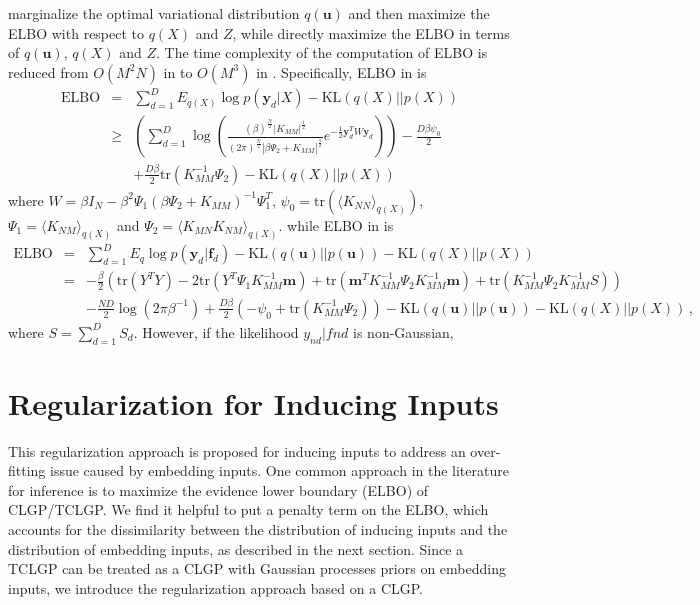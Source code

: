 \documentclass{article}
\begin{document}
\cite{Titsias_2010} marginalize the optimal variational distribution $q(\bm u)$ and then maximize the ELBO with respect to $q(X)$ and $Z$, while \cite{Hensman_2013} directly maximize the ELBO in terms of $q(\bm u)$, $q(X)$ and $Z$. The time complexity of the computation of ELBO is reduced from $O(M^2N)$ in \cite{Titsias_2010} to $O(M^3)$ in \cite{Hensman_2013}. Specifically, ELBO in \cite{Titsias_2010} is
\begin{eqnarray}
\mathrm{ELBO} & = & \sum_{d = 1}^{D} E_{q(X)}\log p(\bm y_d|X) - \mathrm{KL}(q(X)||p(X)) \nonumber \\
& \geq & \left(\sum_{d = 1}^D\log\left(\frac{(\beta)^{\frac{N}{2}}|K_{MM}|^{\frac{1}{2}}}{(2\pi)^{\frac{N}{2}}|\beta\Psi_2 + K_{MM}|^{\frac{1}{2}}} e^{-\frac{1}{2}\bm y_d^TW\bm y_d} \right)\right) - \frac{D\beta\psi_0}{2} \nonumber \\
& & + \frac{D\beta}{2}\mathrm{tr}(K^{-1}_{MM}\Psi_2)- \mathrm{KL}(q(X)||p(X)) \nonumber 
\end{eqnarray}
where $W = \beta I_N - \beta^2\Psi_1(\beta\Psi_2 + K_{MM})^{-1}\Psi_1^T$, $\psi_0 = \mathrm{tr}(\langle K_{NN} \rangle_{q(X)})$, $\Psi_1 = \langle K_{NM} \rangle_{q(X)}$ and $\Psi_2 = \langle K_{MN}K_{NM}\rangle_{q(X)}$. while ELBO in \cite{Hensman_2013} is
\begin{eqnarray}
\mathrm{ELBO} & = & \sum_{d = 1}^{D}E_{q}\log p(\bm y_d|\bm f_d) - \mathrm{KL}(q(\bm u)||p(\bm u)) - \mathrm{KL}(q(X)||p(X)) \nonumber \\
& = & - \frac{\beta}{2}\left( \mathrm{tr}(Y^TY) - 2\mathrm{tr}(Y^T\Psi_1K_{MM}^{-1}\bm m) + \mathrm{tr}(\bm m^TK_{MM}^{-1}\Psi_2K_{MM}^{-1}\bm m) + \mathrm{tr}(K_{MM}^{-1}\Psi_2K_{MM}^{-1}S) \right) \nonumber \\
& & -\frac{ND}{2}\log(2\pi\beta^{-1}) + \frac{D\beta}{2}\left(-\psi_0 + \mathrm{tr}(K_{MM}^{-1}\Psi_2)\right) - \mathrm{KL}(q(\bm u)||p(\bm u)) - \mathrm{KL}(q(X)||p(X)) \,, \nonumber
\end{eqnarray}
where $S = \sum_{d=1}^{D}S_d$. However, if the likelihood $y_{nd}|f{nd}$ is non-Gaussian, 
	
\section{Regularization for Inducing Inputs}
This regularization approach is proposed for inducing inputs to address an over-fitting issue caused by embedding inputs. One common approach in the literature for inference is to maximize the evidence lower boundary (ELBO) of CLGP/TCLGP. We find it helpful to put a penalty term on the ELBO, which accounts for the dissimilarity between the distribution of inducing inputs and the distribution of embedding inputs, as described in the next section. Since a TCLGP can be treated as a CLGP with Gaussian processes priors on embedding inputs, we introduce the regularization approach based on a CLGP.
\end{document}

